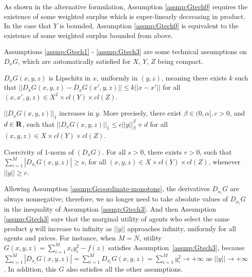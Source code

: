	As shown in the alternative formulation, Assumption \ref{assmp:Gtech0} requires the existence of some weighted surplus which is super-linearly decreasing in product. In the case that $Y$ is bounded, Assumption \ref{assmp:Gtech0} is equivalent to the existence of some weighted surplus bounded from above.   \medskip


Assumptions \ref{assmp:Gtech1} - \ref{assmp:Gtech3} are some technical assumptions on $D_xG$, which are automatically satisfied for $X$, $Y$, $Z$ being compact.\medskip



\begin{assumption}\label{assmp:Gtech1}
	{$D_x G(x,y,z)$ is Lipschitz in $x$},
	uniformly in $(y,z)$, meaning there exists $k$ such that
	$||D_xG(x,y,z)-D_x G(x',y,z)||\le k||x-x'||$ %
	for all $(x, x',y, z)\in X^2\times cl(Y) \times cl(Z)$.
\end{assumption}


\begin{assumption}\label{assmp:Gtech2}
	$||D_x G(x,y,z)||_{1}$ increases in $y$. More precisely, there exist $ \beta \in (0, \alpha], c>0$, and $ d\in {\mathbf R}$, such that $||D_x G(x,y,z)||_{1}\le c||y||_{\beta}^{\beta} +d$ for all $ (x, y, z)\in X\times cl(Y) \times cl(Z)$.
\end{assumption}


\begin{assumption}\label{assmp:Gtech3}
	Coercivity of {$1$-norm} of $(D_xG)$. For all $ s>0$, there exists $r>0$, such that $\sum_{i=1}^{M} |D_{x_i}G(x,y,z)|\ge s$, for all $(x, y, z)\in X\times  cl(Y) \times cl(Z)$, whenever $||y||\ge r$.
\end{assumption}


{Allowing Assumption \ref{assmp:Gcoordinate-monotone}, {the derivatives $D_{x_i}G$ are always nonnegative; therefore,} we no longer need to take absolute values of $D_{x_i}G$ in the inequality of Assumption \ref{assmp:Gtech3}.} And then Assumption \ref{assmp:Gtech3} says that the marginal utility of agents who select the same product $y$ will increase to infinity as $||y||$ approaches infinity, uniformly for all agents and prices. {For instance, when $M = N$, utility $G(x,y,z) = \sum_{i=1}^{M} x_iy_i^2 -f(z) $ satisfies Assumption~\ref{assmp:Gtech3}, because $\sum_{i=1}^{M} |D_{x_i}G(x,y,z)| = \sum_{i=1}^{M} D_{x_i}G(x,y,z) = \sum_{i=1}^{M} y_i^2 \rightarrow +\infty$ as $||y|| \rightarrow + \infty$.  In addition, this $G$ also satisfies all the other assumptions.}\medskip



